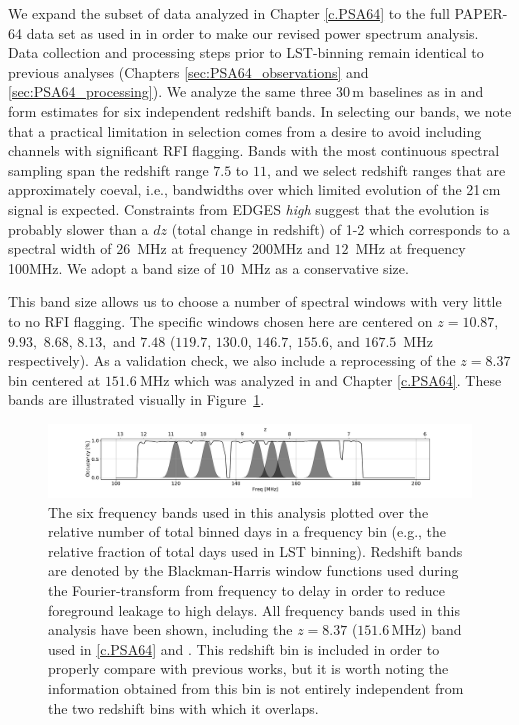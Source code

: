 We expand the subset of data analyzed in Chapter \ref{c.PSA64} to the full PAPER-64 data set as used in  in order to make our revised power spectrum analysis. Data collection and processing steps prior to LST-binning remain identical to previous analyses (Chapters \ref{sec:PSA64_observations} and \ref{sec:PSA64_processing}). We analyze the same three 30\,m baselines as in  and form estimates for six independent redshift bands. In selecting our bands, we note that a practical limitation in selection
comes from a desire to avoid including channels with significant RFI flagging.
Bands with the most continuous spectral sampling span the redshift range $7.5$ to $11$, and we select redshift ranges that are approximately coeval, i.e., bandwidths over which limited evolution of the 21\,cm signal is expected.
Constraints from EDGES \emph{high} suggest that the evolution is probably slower than a $dz$ (total change in
redshift) of 1-2 \citep{monsalve_et_al2017} 
which corresponds to a spectral width of $ 26 $~MHz at frequency 200MHz and 
$12$~MHz at frequency 100MHz.  We adopt a band size of $10$~MHz as a conservative size.

This band size allows us to choose a number of spectral windows with very little to no RFI flagging.  The specific windows chosen here are centered on
$z=10.87,$ $9.93,$ $8.68$, $8.13,$ and $7.48$ ($119.7$, $130.0$, $146.7$, $155.6$, and $167.5$~MHz respectively).
As a validation check, we also include
a reprocessing of the $z=8.37$ bin centered at $151.6~$MHz
which was analyzed in  and Chapter \ref{c.PSA64}.
These bands are illustrated visually in Figure~\ref{fig:freq_select}.

\begin{figure}[t]
\centering
\includegraphics[trim={4cm 0  5cm 0},width=\textwidth]{plots/freq_select_BH.pdf}
\caption{The six frequency bands used in this analysis plotted over the relative number of total binned days in a frequency bin (e.g., the relative fraction of total days used in LST binning).
Redshift bands are denoted by the
Blackman-Harris window functions used during
the Fourier-transform from frequency to delay in order
to reduce foreground leakage to high delays.
All frequency bands used in this analysis have been shown, including the $z=8.37$ ($151.6$\,MHz) band used in \ref{c.PSA64} and \citet{ali_et_al2015}.
This redshift bin is included in order
to properly compare with previous works,
but it is worth noting the information
obtained from this bin is not entirely independent from the two
redshift bins with which it overlaps.
\label{fig:freq_select}}
\end{figure}

